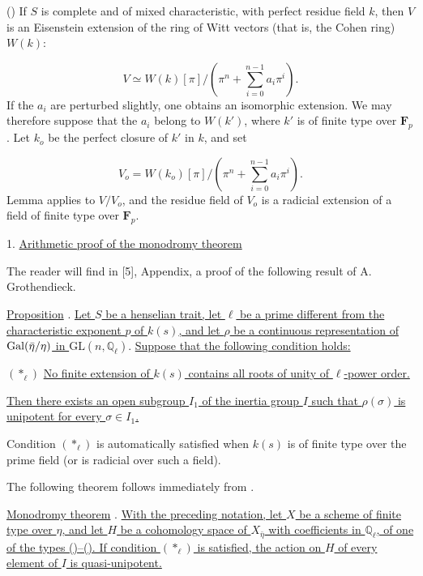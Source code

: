 () If $S$ is complete and of mixed characteristic, with perfect residue field $k$, then $V$ is an Eisenstein extension of the ring of Witt vectors (that is, the Cohen ring) $W(k)$:

\begin{equation*}
V\simeq W(k)[\pi]/\left(\pi^n+\sum_{i=0}^{n-1}a_i\pi^i\right).
\end{equation*}
If the $a_i$ are perturbed slightly, one obtains an isomorphic extension. We may therefore suppose that the $a_i$ belong to $W(k')$, where $k'$ is of finite type over $\mathbf{F}_p$. Let $k_o$ be the perfect closure of $k'$ in $k$, and set

\begin{equation*}
V_o=W(k_o)[\pi]/\left(\pi^n+\sum_{i=0}^{n-1}a_i\pi^i\right).
\end{equation*}
Lemma  applies to $V/V_o$, and the residue field of $V_o$ is a radicial extension of a field of finite type over $\mathbf{F}_p$.

1. \underline{Arithmetic proof of the monodromy theorem}

The reader will find in [5], Appendix, a proof of the following result of A. Grothendieck.

\underline{Proposition} . \underline{Let $S$ be a henselian trait, let $\ell$ be a prime different from the characteristic exponent $p$ of $k(s)$, and let $\rho$ be a continuous representation of $\operatorname{Gal}(\bar\eta/\eta)$ in $\mathrm{GL}(n,\mathbb{Q}_\ell)$}. \underline{Suppose that the following condition holds:}

$(*_\ell)$ \quad \underline{No finite extension of $k(s)$ contains all roots of unity of $\ell$-power order.}


\underline{Then there exists an open subgroup $I_1$ of the inertia group $I$ such that $\rho(\sigma)$ is unipotent for every $\sigma\in I_1$.}

Condition $(*_\ell)$ is automatically satisfied when $k(s)$ is of finite type over the prime field (or is radicial over such a field).

The following theorem follows immediately from .

\underline{Monodromy theorem} . \underline{With the preceding notation, let $X$ be a scheme of finite type over $\eta$, and let $H$ be a cohomology space of $X_{\bar\eta}$ with coefficients in $\mathbb{Q}_\ell$, of one of the types ()--(). If condition $(*_\ell)$ is satisfied, the action on $H$ of every element of $I$ is quasi-unipotent.}

